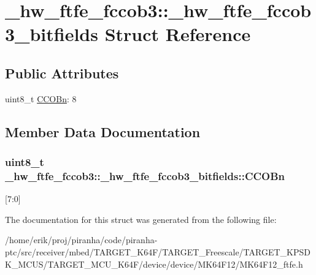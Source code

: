 \hypertarget{struct__hw__ftfe__fccob3_1_1__hw__ftfe__fccob3__bitfields}{}\section{\+\_\+hw\+\_\+ftfe\+\_\+fccob3\+:\+:\+\_\+hw\+\_\+ftfe\+\_\+fccob3\+\_\+bitfields Struct Reference}
\label{struct__hw__ftfe__fccob3_1_1__hw__ftfe__fccob3__bitfields}
\subsection*{Public Attributes}
\begin{DoxyCompactItemize}
\item 
uint8\+\_\+t \hyperlink{struct__hw__ftfe__fccob3_1_1__hw__ftfe__fccob3__bitfields_ad820e16105e3621b7b676b9b2976aaa8}{C\+C\+O\+Bn}\+: 8
\end{DoxyCompactItemize}


\subsection{Member Data Documentation}
\subsubsection[{\texorpdfstring{C\+C\+O\+Bn}{CCOBn}}]{\setlength{\rightskip}{0pt plus 5cm}uint8\+\_\+t \+\_\+hw\+\_\+ftfe\+\_\+fccob3\+::\+\_\+hw\+\_\+ftfe\+\_\+fccob3\+\_\+bitfields\+::\+C\+C\+O\+Bn}\hypertarget{struct__hw__ftfe__fccob3_1_1__hw__ftfe__fccob3__bitfields_ad820e16105e3621b7b676b9b2976aaa8}{}\label{struct__hw__ftfe__fccob3_1_1__hw__ftfe__fccob3__bitfields_ad820e16105e3621b7b676b9b2976aaa8}
\mbox{[}7\+:0\mbox{]} 

The documentation for this struct was generated from the following file\+:\begin{DoxyCompactItemize}
\item 
/home/erik/proj/piranha/code/piranha-\/ptc/src/receiver/mbed/\+T\+A\+R\+G\+E\+T\+\_\+\+K64\+F/\+T\+A\+R\+G\+E\+T\+\_\+\+Freescale/\+T\+A\+R\+G\+E\+T\+\_\+\+K\+P\+S\+D\+K\+\_\+\+M\+C\+U\+S/\+T\+A\+R\+G\+E\+T\+\_\+\+M\+C\+U\+\_\+\+K64\+F/device/device/\+M\+K64\+F12/M\+K64\+F12\+\_\+ftfe.\+h\end{DoxyCompactItemize}
